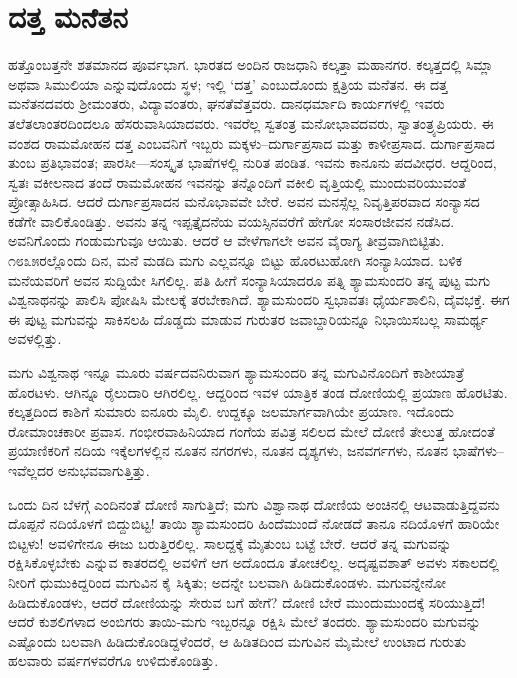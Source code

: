 
\chapter{ದತ್ತ ಮನೆತನ}

ಹತ್ತೊಂಬತ್ತನೇ ಶತಮಾನದ ಪೂರ್ವಭಾಗ. ಭಾರತದ ಅಂದಿನ ರಾಜಧಾನಿ ಕಲ್ಕತ್ತಾ ಮಹಾನಗರ. ಕಲ್ಕತ್ತದಲ್ಲಿ ಸಿಮ್ಲಾ ಅಥವಾ ಸಿಮುಲಿಯಾ ಎನ್ನುವುದೊಂದು ಸ್ಥಳ; ಇಲ್ಲಿ ‘ದತ್ತ’ ಎಂಬುದೊಂದು ಕ್ಷತ್ರಿಯ ಮನೆತನ. ಈ ದತ್ತ ಮನೆತನದವರು ಶ್ರೀಮಂತರು, ವಿದ್ಯಾವಂತರು, ಘನತೆವೆತ್ತವರು. ದಾನಧರ್ಮಾದಿ ಕಾರ್ಯಗಳಲ್ಲಿ ಇವರು ತಲೆತಲಾಂತರದಿಂದಲೂ ಹೆಸರುವಾಸಿಯಾದವರು. ಇವರೆಲ್ಲ ಸ್ವತಂತ್ರ ಮನೋಭಾವದವರು, ಸ್ವಾತಂತ್ರ್ಯಪ್ರಿಯರು. ಈ ವಂಶದ ರಾಮಮೋಹನ ದತ್ತ ಎಂಬವನಿಗೆ ಇಬ್ಬರು ಮಕ್ಕಳು–ದುರ್ಗಾಪ್ರಸಾದ ಮತ್ತು ಕಾಳೀಪ್ರಸಾದ. ದುರ್ಗಾಪ್ರಸಾದ ತುಂಬ ಪ್ರತಿಭಾವಂತ; ಪಾರಸೀ—ಸಂಸ್ಕೃತ ಭಾಷೆಗಳಲ್ಲಿ ನುರಿತ ಪಂಡಿತ. ಇವನು ಕಾನೂನು ಪದವೀಧರ. ಆದ್ದರಿಂದ, ಸ್ವತಃ ವಕೀಲನಾದ ತಂದೆ ರಾಮಮೋಹನ ಇವನನ್ನು ತನ್ನೊಂದಿಗೆ ವಕೀಲಿ ವೃತ್ತಿಯಲ್ಲಿ ಮುಂದುವರಿಯುವಂತೆ ಪ್ರೋತ್ಸಾಹಿಸಿದ. ಆದರೆ ದುರ್ಗಾಪ್ರಸಾದನ ಮನೊಭಾವವೇ ಬೇರೆ. ಅವನ ಮನಸ್ಸೆಲ್ಲ ನಿವೃತ್ತಿಪರವಾದ ಸಂನ್ಯಾಸದ ಕಡೆಗೇ ವಾಲಿಕೊಂಡಿತ್ತು. ಅವನು ತನ್ನ ಇಪ್ಪತ್ತೈದನೆಯ ವಯಸ್ಸಿನವರೆಗೆ ಹೇಗೋ ಸಂಸಾರಜೀವನ ನಡೆಸಿದ. ಅವನಿಗೊಂದು ಗಂಡುಮಗುವೂ ಆಯಿತು. ಆದರೆ ಆ ವೇಳೆಗಾಗಲೇ ಅವನ ವೈರಾಗ್ಯ ತೀವ್ರವಾಗಿಬಿಟ್ಟಿತು. ೧೮೩೫ರಲ್ಲೊಂದು ದಿನ, ಮನೆ ಮಡದಿ ಮಗು ಎಲ್ಲವನ್ನೂ ಬಿಟ್ಟು ಹೊರಟುಹೋಗಿ ಸಂನ್ಯಾಸಿಯಾದ. ಬಳಿಕ ಮನೆಯವರಿಗೆ ಅವನ ಸುದ್ದಿಯೇ ಸಿಗಲಿಲ್ಲ. ಪತಿ ಹೀಗೆ ಸಂನ್ಯಾಸಿಯಾದರೂ ಪತ್ನಿ ಶ್ಯಾಮಸುಂದರಿ ತನ್ನ ಪುಟ್ಟ ಮಗು ವಿಶ್ವನಾಥನನ್ನು ಪಾಲಿಸಿ ಪೋಷಿಸಿ ಮೇಲಕ್ಕೆ ತರಬೇಕಾಗಿದೆ. ಶ್ಯಾಮಸುಂದರಿ ಸ್ವಭಾವತಃ ಧೈರ್ಯಶಾಲಿನಿ, ದೈವಭಕ್ತೆ. ಈಗ ಈ ಪುಟ್ಟ ಮಗುವನ್ನು ಸಾಕಿಸಲಹಿ ದೊಡ್ಡದು ಮಾಡುವ ಗುರುತರ ಜವಾಬ್ದಾರಿಯನ್ನೂ ನಿಭಾಯಿಸಬಲ್ಲ ಸಾಮರ್ಥ್ಯ ಅವಳಲ್ಲಿತ್ತು.

ಮಗು ವಿಶ್ವನಾಥ ಇನ್ನೂ ಮೂರು ವರ್ಷದವನಿರುವಾಗ ಶ್ಯಾಮಸುಂದರಿ ತನ್ನ ಮಗುವಿನೊಂದಿಗೆ ಕಾಶೀಯಾತ್ರೆ ಹೊರಟಳು. ಆಗಿನ್ನೂ ರೈಲುದಾರಿ ಆಗಿರಲಿಲ್ಲ. ಆದ್ದರಿಂದ ಇವಳ ಯಾತ್ರಿಕ ತಂಡ ದೋಣಿಯಲ್ಲಿ ಪ್ರಯಾಣ ಹೊರಟಿತು. ಕಲ್ಕತ್ತದಿಂದ ಕಾಶಿಗೆ ಸುಮಾರು ಐನೂರು ಮೈಲಿ. ಉದ್ದಕ್ಕೂ ಜಲಮಾರ್ಗವಾಗಿಯೇ ಪ್ರಯಾಣ. ಇದೊಂದು ರೋಮಾಂಚಕಾರೀ ಪ್ರವಾಸ. ಗಂಭೀರವಾಹಿನಿಯಾದ ಗಂಗೆಯ ಪವಿತ್ರ ಸಲಿಲದ ಮೇಲೆ ದೋಣಿ ತೇಲುತ್ತ ಹೋದಂತೆ ಪ್ರಯಾಣಿಕರಿಗೆ ನದಿಯ ಇಕ್ಕೆಲ\-ಗಳಲ್ಲಿನ ನೂತನ ನಗರಗಳು, ನೂತನ ದೃಶ್ಯಗಳು, ಜನವರ್ಗಗಳು, ನೂತನ ಭಾಷೆಗಳು–ಇವೆಲ್ಲ\-ದರ ಅನುಭವವಾಗುತ್ತಿತ್ತು.

ಒಂದು ದಿನ ಬೆಳಗ್ಗೆ ಎಂದಿನಂತೆ ದೋಣಿ ಸಾಗುತ್ತಿದೆ; ಮಗು ವಿಶ್ವಾನಾಥ ದೋಣಿಯ ಅಂಚಿನಲ್ಲಿ ಆಟವಾಡುತ್ತಿದ್ದವನು ದೊಪ್ಪನೆ ನದಿಯೊಳಗೆ ಬಿದ್ದುಬಿಟ್ಟ! ತಾಯಿ ಶ್ಯಾಮಸುಂದರಿ ಹಿಂದೆಮುಂದೆ ನೋಡದೆ ತಾನೂ ನದಿಯೊಳಗೆ ಹಾರಿಯೇ ಬಿಟ್ಟಳು! ಅವಳಿಗೇನೂ ಈಜು ಬರುತ್ತಿರಲಿಲ್ಲ. ಸಾಲದ್ದಕ್ಕೆ ಮೈತುಂಬ ಬಟ್ಟೆ ಬೇರೆ. ಆದರೆ ತನ್ನ ಮಗುವನ್ನು ರಕ್ಷಿಸಿಕೊಳ್ಳಬೇಕು ಎನ್ನುವ ಕಾತರದಲ್ಲಿ ಅವಳಿಗೆ ಆಗ ಅದೊಂದೂ ತೋಚಲಿಲ್ಲ. ಅದೃಷ್ಟವಶಾತ್ ಅವಳು ಸಕಾಲದಲ್ಲಿ ನೀರಿಗೆ ಧುಮುಕಿದ್ದರಿಂದ ಮಗುವಿನ ಕೈ ಸಿಕ್ಕಿತು; ಅದನ್ನೇ ಬಲವಾಗಿ ಹಿಡಿದುಕೊಂಡಳು. ಮಗುವನ್ನೇನೋ ಹಿಡಿದುಕೊಂಡಳು, ಆದರೆ ದೋಣಿಯನ್ನು ಸೇರುವ ಬಗೆ ಹೇಗೆ? ದೋಣಿ ಬೇರೆ ಮುಂದುಮುಂದಕ್ಕೆ ಸರಿಯುತ್ತಿದೆ! ಆದರೆ ಕುಶಲಿಗಳಾದ ಅಂಬಿಗರು ತಾಯಿ-ಮಗು ಇಬ್ಬರನ್ನೂ ರಕ್ಷಿಸಿ ಮೇಲೆ ತಂದರು. ಶ್ಯಾಮಸುಂದರಿ ಮಗುವನ್ನು ಎಷ್ಟೊಂದು ಬಲವಾಗಿ ಹಿಡಿದುಕೊಂಡಿದ್ದಳೆಂದರೆ, ಆ ಹಿಡಿತದಿಂದ ಮಗುವಿನ ಮೈಮೇಲೆ ಉಂಟಾದ ಗುರುತು ಹಲವಾರು ವರ್ಷಗಳವರೆಗೂ ಉಳಿದುಕೊಂಡಿತ್ತು.

